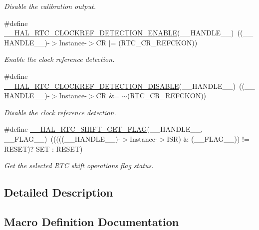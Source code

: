 \begin{DoxyCompactItemize}
\begin{DoxyCompactList}\small\item\em Disable the calibration output. \end{DoxyCompactList}\item 
\#define \hyperlink{group___r_t_c_ex___calibration_ga3fcacefb24751dcb772582e59e50de5e}{\+\_\+\+\_\+\+H\+A\+L\+\_\+\+R\+T\+C\+\_\+\+C\+L\+O\+C\+K\+R\+E\+F\+\_\+\+D\+E\+T\+E\+C\+T\+I\+O\+N\+\_\+\+E\+N\+A\+B\+LE}(\+\_\+\+\_\+\+H\+A\+N\+D\+L\+E\+\_\+\+\_\+)~((\+\_\+\+\_\+\+H\+A\+N\+D\+L\+E\+\_\+\+\_\+)-\/$>$Instance-\/$>$CR $\vert$= (R\+T\+C\+\_\+\+C\+R\+\_\+\+R\+E\+F\+C\+K\+ON))
\begin{DoxyCompactList}\small\item\em Enable the clock reference detection. \end{DoxyCompactList}\item 
\#define \hyperlink{group___r_t_c_ex___calibration_ga8e989c42c1f4139cc1e021c42638d86b}{\+\_\+\+\_\+\+H\+A\+L\+\_\+\+R\+T\+C\+\_\+\+C\+L\+O\+C\+K\+R\+E\+F\+\_\+\+D\+E\+T\+E\+C\+T\+I\+O\+N\+\_\+\+D\+I\+S\+A\+B\+LE}(\+\_\+\+\_\+\+H\+A\+N\+D\+L\+E\+\_\+\+\_\+)~((\+\_\+\+\_\+\+H\+A\+N\+D\+L\+E\+\_\+\+\_\+)-\/$>$Instance-\/$>$CR \&= $\sim$(R\+T\+C\+\_\+\+C\+R\+\_\+\+R\+E\+F\+C\+K\+ON))
\begin{DoxyCompactList}\small\item\em Disable the clock reference detection. \end{DoxyCompactList}\item 
\#define \hyperlink{group___r_t_c_ex___calibration_ga5e1482310c213248d8416b24a5e6b3f3}{\+\_\+\+\_\+\+H\+A\+L\+\_\+\+R\+T\+C\+\_\+\+S\+H\+I\+F\+T\+\_\+\+G\+E\+T\+\_\+\+F\+L\+AG}(\+\_\+\+\_\+\+H\+A\+N\+D\+L\+E\+\_\+\+\_\+,  \+\_\+\+\_\+\+F\+L\+A\+G\+\_\+\+\_\+)~(((((\+\_\+\+\_\+\+H\+A\+N\+D\+L\+E\+\_\+\+\_\+)-\/$>$Instance-\/$>$I\+SR) \& (\+\_\+\+\_\+\+F\+L\+A\+G\+\_\+\+\_\+)) != R\+E\+S\+ET)? S\+ET \+: R\+E\+S\+ET)
\begin{DoxyCompactList}\small\item\em Get the selected R\+TC shift operation\textquotesingle{}s flag status. \end{DoxyCompactList}\end{DoxyCompactItemize}


\subsection{Detailed Description}


\subsection{Macro Definition Documentation}
